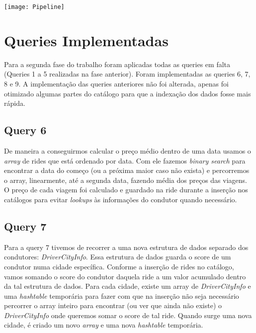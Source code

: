 \documentclass{article}
\begin{document}
        \bigskip
        
        \begin{center}
            \texttt{[image: Pipeline]}
        \end{center}
    \section{Queries Implementadas}
        Para a segunda fase do trabalho foram aplicadas todas as queries em falta
        (Queries 1 a 5 realizadas na fase anterior). Foram implementadas as queries 6, 7, 8 e 9.
        A implementação das queries anteriores não foi alterada, apenas foi otimizado
        algumas partes do catálogo para que a indexação dos dados fosse mais rápida.
        \subsection{Query 6}
            De maneira a conseguirmos calcular o preço médio dentro de uma data usamos
            o \emph{array} de rides que está ordenado por data. Com ele fazemos \emph{binary search} para
            encontrar a data do começo (ou a próxima maior caso não exista) e percorremos o array, 
            linearmente, até a segunda data, fazendo média dos preços das viagens. O preço
            de cada viagem foi calculado e guardado na ride durante a inserção nos catálogos para evitar
            \emph{lookups} às informações do condutor quando necessário.
        \subsection{Query 7}
            Para a query 7 tivemos de recorrer a uma nova estrutura de dados separado dos condutores: \emph{DriverCityInfo}. 
            Essa estrutura de dados guarda o score de um condutor numa cidade específica.
            Conforme a inserção de rides no catálogo, vamos somando o score do condutor daquela ride
            a um valor acumulado dentro da tal estrutura de dados. Para cada cidade, existe um array de \emph{DriverCityInfo} e
            uma \emph{hashtable} temporária para fazer com que na inserção não
            seja necessário percorrer o array inteiro para encontrar (ou ver que ainda não existe)
            o \emph{DriverCityInfo} onde queremos somar o score de tal ride. 
            Quando surge uma nova cidade, é criado um novo \emph{array} e uma nova \emph{hashtable} temporária.
            
\end{document}
